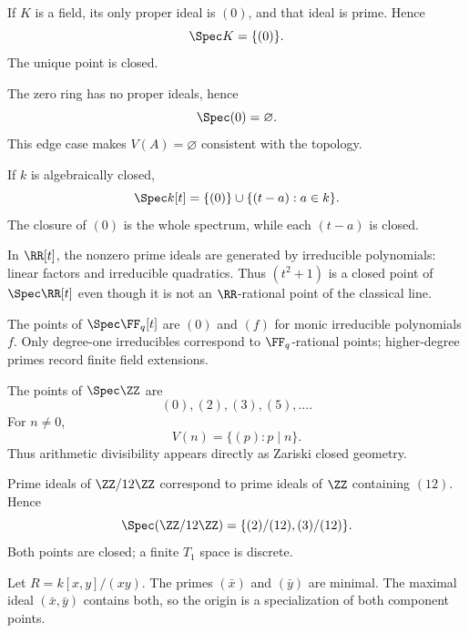 \begin{example}
If $K$ is a field, its only proper ideal is $(0)$, and that ideal is prime. Hence
\[
\Spec K=\{(0)\}.
\]
The unique point is closed.
\end{example}

\begin{example}
The zero ring has no proper ideals, hence
\[
\Spec(0)=\varnothing.
\]
This edge case makes $V(A)=\varnothing$ consistent with the topology.
\end{example}

\begin{example}
If $k$ is algebraically closed,
\[
\Spec k[t]=\{(0)\}\cup\{(t-a):a\in k\}.
\]
The closure of $(0)$ is the whole spectrum, while each $(t-a)$ is closed.
\end{example}

\begin{example}
In $\RR[t]$, the nonzero prime ideals are generated by irreducible polynomials:
linear factors and irreducible quadratics.  Thus $(t^2+1)$ is a closed point of
$\Spec\RR[t]$ even though it is not an $\RR$-rational point of the classical line.
\end{example}

\begin{example}
The points of $\Spec\FF_q[t]$ are $(0)$ and $(f)$ for monic irreducible polynomials $f$.
Only degree-one irreducibles correspond to $\FF_q$-rational points; higher-degree primes
record finite field extensions.
\end{example}

\begin{example}
The points of $\Spec\ZZ$ are
\[
(0),(2),(3),(5),\dots.
\]
For $n\neq0$,
\[
V(n)=\{(p):p\mid n\}.
\]
Thus arithmetic divisibility appears directly as Zariski closed geometry.
\end{example}

\begin{example}
Prime ideals of $\ZZ/12\ZZ$ correspond to prime ideals of $\ZZ$ containing $(12)$.
Hence
\[
\Spec(\ZZ/12\ZZ)=\{(2)/(12),(3)/(12)\}.
\]
Both points are closed; a finite $T_1$ space is discrete.
\end{example}

\begin{example}
Let $R=k[x,y]/(xy)$.  The primes $(\bar x)$ and $(\bar y)$ are minimal.  The maximal ideal
$(\bar x,\bar y)$ contains both, so the origin is a specialization of both component points.
\end{example}


